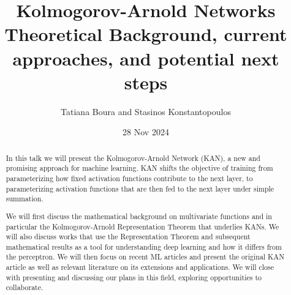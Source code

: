 \documentclass{article}
\author{Tatiana Boura and Stasinos Konstantopoulos}
\title{Kolmogorov-Arnold Networks \\
  Theoretical Background, current approaches, and potential next steps}
\date{28 Nov 2024}
\begin{document}
\maketitle

\begin{abstract}

In this talk we will present the Kolmogorov-Arnold Network (KAN),
a new and promising approach for machine learning. KAN shifts the
objective of training from parameterizing how fixed activation
functions contribute to the next layer, to parameterizing activation
functions that are then fed to the next layer under simple summation.

We will first discuss the mathematical background on
multivariate functions and in particular the Kolmogorov-Arnold Representation
Theorem that underlies KANs. We will also discuss works that use the
Representation Theorem and subsequent mathematical results as a tool for
understanding deep learning and how it differs from the perceptron. We will
then focus on recent ML articles and present the original KAN article as well
as relevant literature on its extensions and applications. We will close with
presenting and discussing our plans in this field, exploring opportunities to
collaborate.

\end{abstract}

\nocite{*}


\end{document}
